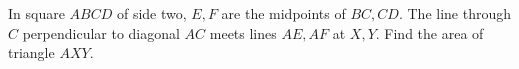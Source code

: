 In square $ABCD$ of side two, $E,F$ are the midpoints of $BC,CD$. The line through $C$ perpendicular to diagonal $AC$ meets lines $AE,AF$ at $X,Y$. Find the area of triangle $AXY$.
